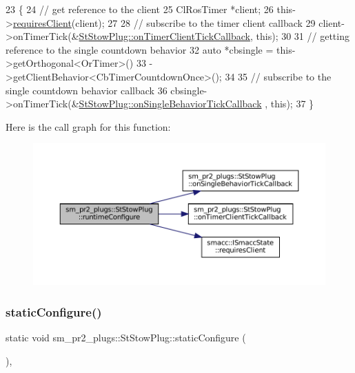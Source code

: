 \begin{DoxyCode}
23     \{
24         \textcolor{comment}{// get reference to the client}
25         ClRosTimer *client;
26         this->\hyperlink{classsmacc_1_1ISmaccState_a7f95c9f0a6ea2d6f18d1aec0519de4ac}{requiresClient}(client);
27 
28         \textcolor{comment}{// subscribe to the timer client callback}
29         client->onTimerTick(&\hyperlink{structsm__pr2__plugs_1_1StStowPlug_ae757556cb3fd58c9db771327744973bf}{StStowPlug::onTimerClientTickCallback}, \textcolor{keyword}{
      this});
30 
31         \textcolor{comment}{// getting reference to the single countdown behavior}
32         \textcolor{keyword}{auto} *cbsingle = this->getOrthogonal<OrTimer>()
33                              ->getClientBehavior<CbTimerCountdownOnce>();
34 
35         \textcolor{comment}{// subscribe to the single countdown behavior callback}
36         cbsingle->onTimerTick(&\hyperlink{structsm__pr2__plugs_1_1StStowPlug_a69f661686818a913827a9048ebe4d259}{StStowPlug::onSingleBehaviorTickCallback}
      , \textcolor{keyword}{this});
37     \}
\end{DoxyCode}
Here is the call graph for this function\+:
\nopagebreak
\begin{figure}[H]
\begin{center}
\leavevmode
\includegraphics[width=350pt]{structsm__pr2__plugs_1_1StStowPlug_a7a8c96a9affcf5e333fc0e96575141ec_cgraph}
\end{center}
\end{figure}
\mbox{\label{structsm__pr2__plugs_1_1StStowPlug_a42733344b68d5558e349bf56db98efd6}} 
\subsubsection{\texorpdfstring{static\+Configure()}{staticConfigure()}}
{\footnotesize\ttfamily static void sm\+\_\+pr2\+\_\+plugs\+::\+St\+Stow\+Plug\+::static\+Configure (\begin{DoxyParamCaption}{ }\end{DoxyParamCaption})\hspace{0.3cm}{\ttfamily [inline]}, {\ttfamily [static]}}




